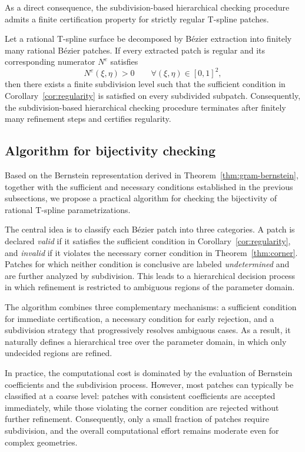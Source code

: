 \documentclass{jssc}
\begin{document}
As a direct consequence, the subdivision-based hierarchical checking procedure admits a finite certification property for strictly regular T-spline patches.

\begin{corollary}
\label{cor:finite_certification}
Let a rational T-spline surface be decomposed by B\'ezier extraction into finitely many rational B\'ezier patches.
If every extracted patch is regular and its corresponding numerator $N^e$ satisfies
\[
N^e(\xi,\eta) > 0
\qquad \forall (\xi,\eta)\in[0,1]^2,
\]
then there exists a finite subdivision level such that the sufficient condition in Corollary~\ref{cor:regularity} is satisfied on every subdivided subpatch.
Consequently, the subdivision-based hierarchical checking procedure terminates after finitely many refinement steps and certifies regularity.
\end{corollary}

\subsection{Algorithm for bijectivity checking}

Based on the Bernstein representation derived in Theorem~\ref{thm:gram-bernstein}, together with the sufficient and necessary conditions established in the previous subsections, we propose a practical algorithm for checking the bijectivity of rational T-spline parametrizations.

The central idea is to classify each B\'ezier patch into three categories. A patch is declared \emph{valid} if it satisfies the sufficient condition in Corollary~\ref{cor:regularity}, and \emph{invalid} if it violates the necessary corner condition in Theorem~\ref{thm:corner}. Patches for which neither condition is conclusive are labeled \emph{undetermined} and are further analyzed by subdivision. This leads to a hierarchical decision process in which refinement is restricted to ambiguous regions of the parameter domain.

The algorithm combines three complementary mechanisms: a sufficient condition for immediate certification, a necessary condition for early rejection, and a subdivision strategy that progressively resolves ambiguous cases. As a result, it naturally defines a hierarchical tree over the parameter domain, in which only undecided regions are refined.

In practice, the computational cost is dominated by the evaluation of Bernstein coefficients and the subdivision process. However, most patches can typically be classified at a coarse level: patches with consistent coefficients are accepted immediately, while those violating the corner condition are rejected without further refinement. Consequently, only a small fraction of patches require subdivision, and the overall computational effort remains moderate even for complex geometries.
\end{document}
